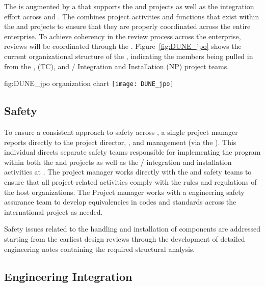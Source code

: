 The  is augmented by a  that supports the
 and  projects as well as the integration
effort across  and . The  
combines project activities and functions that exist within the 
 and  projects to ensure that they are 
properly coordinated across the entire enterprise.    
To achieve coherency in the review process across the 
 enterprise, reviews will be coordinated 
through the . 
Figure~\ref{fig:DUNE_jpo} shows the current organizational 
structure of the , indicating the members being 
pulled in from the ,  (TC), and 
/ Integration and Installation (NP) 
project teams.

\begin{dunefigure}{fig:DUNE_jpo}
  { organization chart}
  \texttt{[image: DUNE\_jpo]}
\end{dunefigure}


\subsection{Safety}
\label{sec:dune_safety}

To ensure a consistent approach to safety across ,
a single project  manager reports directly 
to the  project director, , and 
management (via the  ).  This individual
directs separate safety teams responsible for implementing the 
  program within both the  
and  projects as well as the /
integration and installation activities at .  The 
project  manager works directly with the  
and  safety teams to ensure that all project-related 
activities comply with the rules and regulations of the host 
organizations.  The Project  manager works with a  
engineering safety assurance team to develop
equivalencies in codes and standards across the international project
as needed.

Safety issues related to the handling 
and installation of components are addressed starting 
from the earliest design reviews through the development 
of detailed engineering notes containing the required
structural analysis.


\subsection{Engineering Integration}
\label{sec:dune_engineering}

